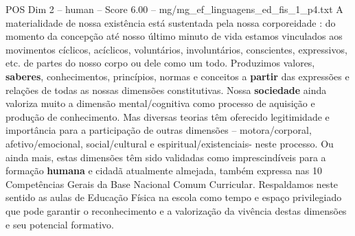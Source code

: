\begin{textsample}{POS Dim 2 – human – Score 6.00 – mg/mg\_ef\_linguagens\_ed\_fis\_1\_p4.txt}  \label{ex:f2_pos_014}
A materialidade de nossa existência está sustentada pela nossa corporeidade : do momento da concepção até nosso último minuto de vida estamos vinculados aos movimentos cíclicos, acíclicos, voluntários, involuntários, conscientes, expressivos, etc. de partes do nosso corpo ou dele como um todo.
Produzimos valores, \textbf{saberes}, conhecimentos, princípios, normas e conceitos a \textbf{partir} das expressões e relações de todas as nossas dimensões constitutivas.
Nossa \textbf{sociedade} ainda valoriza muito a dimensão mental/cognitiva como processo de aquisição e produção de conhecimento.
Mas diversas teorias têm oferecido legitimidade e importância para a participação de outras dimensões – motora/corporal, afetivo/emocional, social/cultural e espiritual/existenciais- neste processo.
Ou ainda mais, estas dimensões têm sido validadas como imprescindíveis para a formação \textbf{humana} e cidadã atualmente almejada, também expressa nas 10 Competências Gerais da Base Nacional Comum Curricular.
Respaldamos neste sentido as aulas de Educação Física na escola como tempo e espaço privilegiado que pode garantir o reconhecimento e a valorização da vivência destas dimensões e seu potencial formativo.

\end{textsample}
